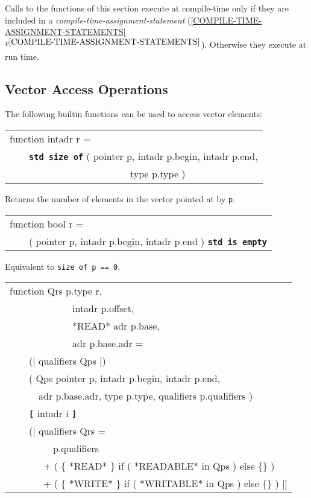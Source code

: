 \documentclass[12pt]{article}
\makeatletter
\newcommand{\TT}[1]{{\tt \bfseries #1}}
\newcommand{\ttstdmkey}[2]{\TT{std #1}\index{#1@{\tt std #1}!#2}}
\newcommand{\ttmindex}[2]{\index{#1@{\tt #1}!#2}}
\newcommand{\itemref}[1]{\ref{#1}$^{p\pageref{#1}}$}
\newcommand{\EOL}{\penalty \exhyphenpenalty}
\newenvironment{indpar}[1][0.3in]%
	{\begin{list}{}%
		     {\setlength{\itemsep}{0in}%
		      \setlength{\topsep}{0in}%
		      \setlength{\parsep}{1ex}%
		      \setlength{\labelwidth}{#1}%
		      \setlength{\leftmargin}{#1}%
		      \addtolength{\leftmargin}{\labelsep}}%
	 \item}%
	{\end{list}}
\makeatother
\begin{document}
Calls to the functions of this section execute at compile-time only if
they are included in a {\em compile-time-assign\-ment-\EOL statement}
(\itemref{COMPILE-TIME-ASSIGNMENT-STATEMENTS}).
Otherwise they execute at run time.

\subsection{Vector Access Operations}
\label{VECTOR-ACCESS-OPERATIONS}

The following builtin functions can be used to access vector elements:

\begin{indpar}

{\tt\begin{tabular}{@{}l}
function intadr r = \\
~~~~\ttstdmkey{size of}{pointer}
            ( pointer p, intadr p.begin, intadr p.end, \\
~~~~~~~~~~~~~~~~~~~~~~~~~type p.type ) \\
\end{tabular}}

\begin{indpar}
Returns the number of elements
in the vector pointed at by {\tt p}.
\end{indpar}

{\tt\begin{tabular}{@{}l}
function bool r = \\
~~~~( pointer p, intadr p.begin, intadr p.end )
    \ttstdmkey{is empty}{pointer}
\end{tabular}}

\begin{indpar}
Equivalent to {\tt size of p == 0}.
\end{indpar}

{\tt\begin{tabular}{@{}l}
function Qrs p.type r, \\
~~~~~~~~~~~~~intadr p.offset, \\
~~~~~~~~~~~~~*READ* adr p.base, \\
~~~~~~~~~~~~~adr p.base.adr = \\
~~~~(| qualifiers Qps |) \\
~~~~( Qps pointer p, intadr p.begin, intadr p.end, \\
~~~~~~adr p.base.adr, type p.type, qualifiers p.qualifiers ) \\
~~~~\TT{[} intadr i \TT{]}\ttmindex{[]}{of pointer} \\
~~~~(| qualifiers Qrs = \\
~~~~~~~~~p.qualifiers \\
~~~~~~~+ ( \{ *READ* \} if ( *READABLE* in Qps ) else \{\} ) \\
~~~~~~~+ ( \{ *WRITE* \} if ( *WRITABLE* in Qps ) else \{\} )  |] \\
\end{tabular}}


\end{indpar}
\end{document}
